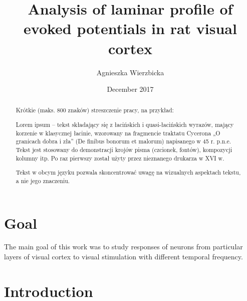 \documentclass{pracalicmgr}
\author{Agnieszka Wierzbicka}
\title{Analysis of laminar profile of evoked potentials in rat visual cortex}
\date{December 2017}
\begin{document}
    \maketitle
    \let\cleardoublepage\clearpage
    
    \begin{abstract}
Krótkie (maks. 800 znaków) streszczenie pracy, na przykład:

Lorem ipsum – tekst składający się z łacińskich i quasi-łacińskich wyrazów, mający korzenie w klasycznej łacinie, wzorowany na fragmencie traktatu Cycerona „O granicach dobra i zła” (De finibus bonorum et malorum) napisanego w 45 r. p.n.e. Tekst jest stosowany do demonstracji krojów pisma (czcionek, fontów), kompozycji kolumny itp. Po raz pierwszy został użyty przez nieznanego drukarza w XVI w.

Tekst w obcym języku pozwala skoncentrować uwagę na wizualnych aspektach tekstu, a nie jego znaczeniu.


     \end{abstract}

  
    \tableofcontents
    
    \chapter*{Goal}
    The main goal of this work was to study responses of neurons from particular layers of visual cortex to visual stimulation with different temporal frequency.
    
    \chapter{Introduction}
    
\end{document}
